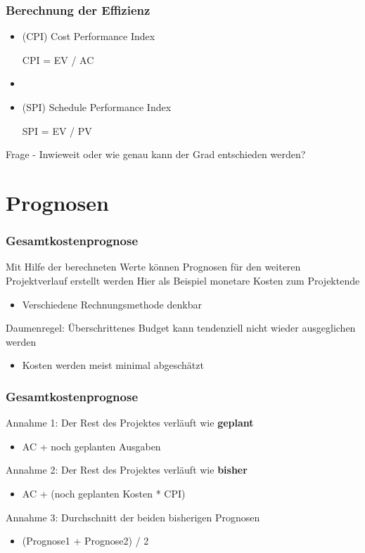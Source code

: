 \documentclass{f4_beamer}
\begin{document}
\begin{frame}[fragile]
    \frametitle{Berechnung der Effizienz}
    \LARGE
    \begin{itemize}
        \item (CPI) Cost Performance Index
        \begin{center}
            CPI = EV / AC
        \end{center}
        \item[]
        \item (SPI) Schedule Performance Index
        \begin{center}
            SPI = EV / PV
        \end{center}
    \end{itemize}
\end{frame}
\begin{frame}[fragile]
    \huge
    Frage - Inwieweit oder wie genau kann der Grad entschieden werden?
\end{frame}


\section{Prognosen}
\begin{frame}[fragile]
    \frametitle{Gesamtkostenprognose}
    \Large
    Mit Hilfe der berechneten Werte können Prognosen für den weiteren Projektverlauf erstellt werden
    Hier als Beispiel monetare Kosten zum Projektende
    \begin{itemize}
        \item Verschiedene Rechnungsmethode denkbar
    \end{itemize}
    Daumenregel: Überschrittenes Budget kann tendenziell nicht wieder ausgeglichen werden
    \begin{itemize}
        \item Kosten werden meist minimal abgeschätzt
    \end{itemize}
\end{frame}
\begin{frame}[fragile]
    \frametitle{Gesamtkostenprognose}
    \Large
    Annahme 1: Der Rest des Projektes verläuft wie \textbf{geplant}
    \begin{itemize}
        \item AC + noch geplanten Ausgaben
    \end{itemize}
    \bigbreak
    Annahme 2: Der Rest des Projektes verläuft wie \textbf{bisher}
    \begin{itemize}
        \item AC + (noch geplanten Kosten * CPI)
    \end{itemize}
    \bigbreak
    Annahme 3: Durchschnitt der beiden bisherigen Prognosen
    \begin{itemize}
        \item (Prognose1 + Prognose2) / 2
    \end{itemize}
\end{frame}
\end{document}
